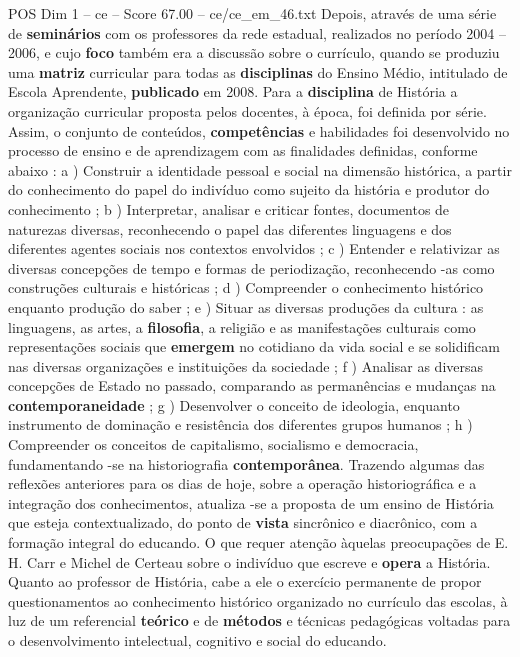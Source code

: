 \begin{textsample}{POS Dim 1 – ce – Score 67.00 – ce/ce\_em\_46.txt}
Depois, através de uma série de \textbf{seminários} com os professores da rede estadual, realizados no período 2004 – 2006, e cujo \textbf{foco} também era a discussão sobre o currículo, quando se produziu uma \textbf{matriz} curricular para todas as \textbf{disciplinas} do Ensino Médio, intitulado de Escola Aprendente, \textbf{publicado} em 2008.
Para a \textbf{disciplina} de História a organização curricular proposta pelos docentes, à época, foi definida por série.
Assim, o conjunto de conteúdos, \textbf{competências} e habilidades foi desenvolvido no processo de ensino e de aprendizagem com as finalidades definidas, conforme abaixo : a ) Construir a identidade pessoal e social na dimensão histórica, a partir do conhecimento do papel do indivíduo como sujeito da história e produtor do conhecimento ; b ) Interpretar, analisar e criticar fontes, documentos de naturezas diversas, reconhecendo o papel das diferentes linguagens e dos diferentes agentes sociais nos contextos envolvidos ; c ) Entender e relativizar as diversas concepções de tempo e formas de periodização, reconhecendo -as como construções culturais e históricas ; d ) Compreender o conhecimento histórico enquanto produção do saber ; e ) Situar as diversas produções da cultura : as linguagens, as artes, a \textbf{filosofia}, a religião e as manifestações culturais como representações sociais que \textbf{emergem} no cotidiano da vida social e se solidificam nas diversas organizações e instituições da sociedade ; f ) Analisar as diversas concepções de Estado no passado, comparando as permanências e mudanças na \textbf{contemporaneidade} ; g ) Desenvolver o conceito de ideologia, enquanto instrumento de dominação e resistência dos diferentes grupos humanos ; h ) Compreender os conceitos de capitalismo, socialismo e democracia, fundamentando -se na historiografia \textbf{contemporânea}.
Trazendo algumas das reflexões anteriores para os dias de hoje, sobre a operação historiográfica e a integração dos conhecimentos, atualiza -se a proposta de um ensino de História que esteja contextualizado, do ponto de \textbf{vista} sincrônico e diacrônico, com a formação integral do educando.
O que requer atenção àquelas preocupações de E.
H.
Carr e Michel de Certeau sobre o indivíduo que escreve e \textbf{opera} a História.
Quanto ao professor de História, cabe a ele o exercício permanente de propor questionamentos ao conhecimento histórico organizado no currículo das escolas, à luz de um referencial \textbf{teórico} e de \textbf{métodos} e técnicas pedagógicas voltadas para o desenvolvimento intelectual, cognitivo e social do educando.

\end{textsample}

